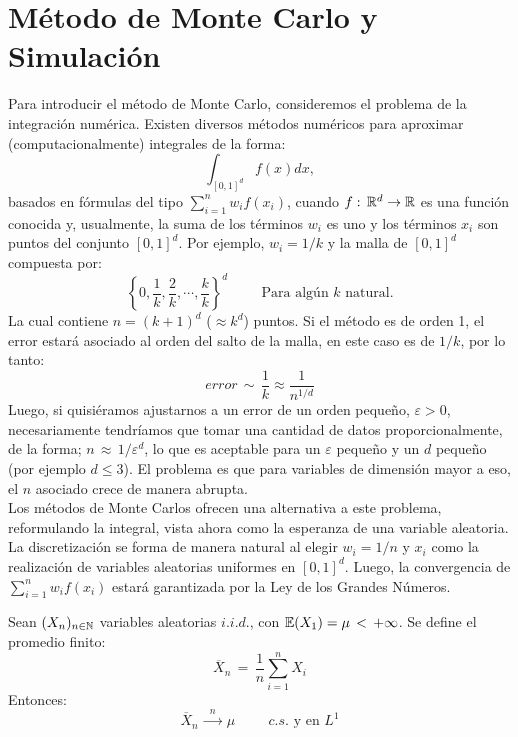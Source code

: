 
\section{Método de Monte Carlo y Simulación}
Para introducir el método de Monte Carlo, consideremos el problema de la integración numérica. Existen diversos métodos numéricos para aproximar (computacionalmente) integrales de la forma:
\[\int_{[0,1]^d}f(x)dx,\]
basados en fórmulas del tipo $\sum_{i=1}^n w_if(x_i)$, cuando $f:\,\mathbb R^d\rightarrow\mathbb R$ es una función conocida y, usualmente, la suma de los términos $w_i$ es uno y los términos $x_i$ son puntos del conjunto $[0,1]^d$. Por ejemplo, $w_i = 1/k$ y la malla de $[0,1]^d$ compuesta por:
\[\left\{0,\frac{1}{k},\frac{2}{k},\cdots,\frac{k}{k}\right\}^d\hspace{1cm}\text{Para algún $k$ natural.}\]
La cual contiene $n = (k+1)^d$ ($\approx k^d $) puntos. Si el método es de orden 1, el error estará asociado al orden del salto de la malla, en este caso es de $1/k$, por lo tanto:
\[error\,\sim\,\frac{1}{k}\approx \frac{1}{n^{1/d}}\]
Luego, si quisiéramos ajustarnos a un error de un orden pequeño, $\varepsilon > 0$, necesariamente tendríamos que tomar una cantidad de datos proporcionalmente, de la forma; $n\,\approx\,1/\varepsilon^d$, lo que es aceptable para un $\varepsilon$ pequeño y un $d$ pequeño (por ejemplo $d\leq 3$). El problema es que para variables de dimensión mayor a eso, el $n$ asociado crece de manera abrupta. \\Los métodos de Monte Carlos ofrecen una alternativa a este problema, reformulando la integral, vista ahora como la esperanza de una variable aleatoria. La discretización se forma de manera natural al elegir $w_i = 1/n$ y $x_i$ como la realización de variables aleatorias uniformes en $[0,1]^d$. Luego, la convergencia de $\sum_{i=1}^n w_if(x_i)$ estará garantizada por la Ley de los Grandes Números.

\begin{teorema} Sean $(X_n)_{n\in\mathbb N}$ variables aleatorias $i.i.d.$, con $\mathbb E(X_1)=\mu\,<\,+\infty$. Se define el promedio finito:
\[\overline{X}_n\,=\,\frac{1}{n}\sum_{i=1}^nX_i\]
Entonces:
\[\overline{X}_n\,\xrightarrow{\,\,\,n\,\,\,}\,\mu\hspace{1cm}c.s.\text{ y en }L^1\]
\end{teorema}

